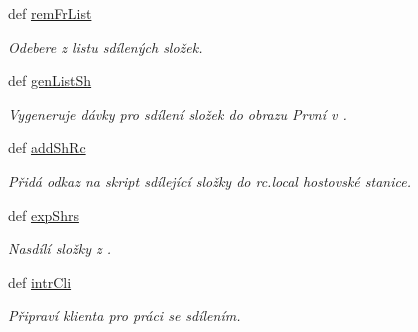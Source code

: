 \begin{DoxyCompactItemize}
def \hyperlink{classShrFol_1_1ShrFol_a73b990abe1e0a91da9f90fda31c686b7}{rem\-Fr\-List}
\begin{DoxyCompactList}\small\item\em Odebere z listu sdílených složek. \end{DoxyCompactList}\item 
def \hyperlink{classShrFol_1_1ShrFol_a689d7f68c00bb7fb068646bdbbec97b8}{gen\-List\-Sh}
\begin{DoxyCompactList}\small\item\em Vygeneruje dávky pro sdílení složek do obrazu První v . \end{DoxyCompactList}\item 
def \hyperlink{classShrFol_1_1ShrFol_a04f993258bc66b3f4702891962fbfcd2}{add\-Sh\-Rc}
\begin{DoxyCompactList}\small\item\em Přidá odkaz na skript sdílející složky do rc.\-local hostovské stanice. \end{DoxyCompactList}\item 
def \hyperlink{classShrFol_1_1ShrFol_a115dac3a241b1c02fb8076e30d8b0eed}{exp\-Shrs}
\begin{DoxyCompactList}\small\item\em Nasdílí složky z . \end{DoxyCompactList}\item 
def \hyperlink{classShrFol_1_1ShrFol_a1419a3ffeaca3209922efb5179bf6b44}{intr\-Cli}
\begin{DoxyCompactList}\small\item\em Připraví klienta pro práci se sdílením. \end{DoxyCompactList}\end{DoxyCompactItemize}
